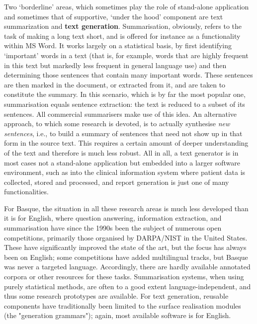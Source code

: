 \begin{multicols}{2}
Two ‘borderline’ areas, which sometimes play the role of stand-alone application and sometimes that of supportive, ‘under the hood’ component are %
text summariza\-tion and \textbf{text generation}. Summarisation, obviously, refers to the task of making a long text short, and is offered for instance as a functionality within MS Word. It works largely on a statistical basis, by first identifying ‘important’ words in a text (that is, for example, words that are highly frequent in this text but markedly less frequent in general language use) and then determining those sentences that contain many important words. These sentences are then marked in the document, or extracted from it, and are taken to constitute the summary. In this scenario, which is by far the most popular one, summarisation equals sentence extraction: the text is reduced to a subset of its sentences. All commercial summarisers make use of this idea. An alternative approach, to which some research is devoted, is to actually synthesise \textit{new sentences}, i.e., to build a summary of sentences that need not show up in that form in the source text. This requires a certain amount of deeper understanding of the text and therefore is much less robust. All in all, a text generator is in most cases not a stand-alone application but embedded into a larger software environment, such as into the clinical information system where patient data is collected, stored and processed, and report generation is just one of many functionalities.


For Basque, the situation in all these research areas is much less developed than it is for English, where question answering, information extraction, and summarisation have since the 1990s been the subject of numerous open competitions, primarily those organised by DARPA/NIST in the United States. These have significantly improved the state of the art, but the focus has always been on English; some competitions have added multilingual tracks, but Basque was never a targeted language. Accordingly, there are hardly available annotated corpora or other resources for these tasks. Summarisation systems, when using purely statistical methods, are often to a good extent language-independent, and thus some research prototypes are available. For text generation, reusable components have traditionally been limited to the surface realisation modules (the "generation grammars"); again, most available software is for English.


\end{multicols}
